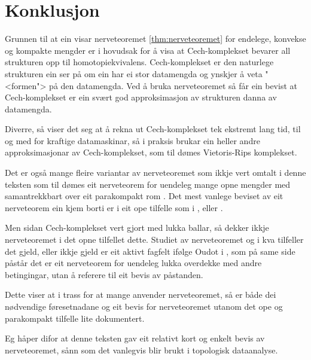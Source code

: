 \documentclass[a4paper, 12pt, norsk]{article}
\theoremstyle{plain}
\theoremstyle{definition}
\begin{document}
\section{Konklusjon}

Grunnen til at ein visar nerveteoremet \autoref{thm:nerveteoremet} for endelege, konvekse og kompakte mengder er i hovudsak for å visa at Cech-komplekset bevarer all strukturen opp til homotopiekvivalens. Cech-komplekset er den naturlege strukturen ein ser på om ein har ei stor datamengda og ynskjer å veta "<formen"> på den datamengda. Ved å bruka nerveteoremet så får ein bevist at Cech-komplekset er ein svært god approksimasjon av strukturen danna av datamengda.

Diverre, så viser det seg at å rekna ut Cech-komplekset tek ekstremt lang tid, til og med for kraftige datamaskinar, så i praksis brukar ein heller andre approksimasjonar av Cech-komplekset, som til dømes Vietoris-Rips komplekset. %

Det er også mange fleire variantar av nerveteoremet som ikkje vert omtalt i denne teksten som til dømes eit nerveteorem for uendeleg mange opne mengder med samantrekkbart over eit parakompakt rom \cite[Corollary 4G.3]{MR1867354}. Det mest vanlege beviset av eit nerveteorem ein kjem borti er i eit ope tilfelle som i \cite[Theorem 15.21]{MR2361455}, \cite[Theorem 4.3]{MR4218370} eller \cite[Theorem 2.3]{MR2476414}.

Men sidan Cech-komplekset vert gjort med lukka ballar, så dekker ikkje nerveteoremet i det opne tilfellet dette. Studiet av nerveteoremet og i kva tilfeller det gjeld, eller ikkje gjeld er eit aktivt fagfelt ifølge Oudot i \cite[s. 82]{MR3408277}, som på same side påstår det er eit nerveteorem for uendeleg lukka overdekke med andre betingingar, utan å referere til eit bevis av påstanden.

Dette viser at i trass for at mange anvender nerveteoremet, så er både dei nødvendige føresetnadane og eit bevis for nerveteoremet utanom det ope og parakompakt tilfelle lite dokumentert.

Eg håper difor at denne teksten gav eit relativt kort og enkelt bevis av nerveteoremet, sånn som det vanlegvis blir brukt i topologisk dataanalyse.

{}

\end{document}
